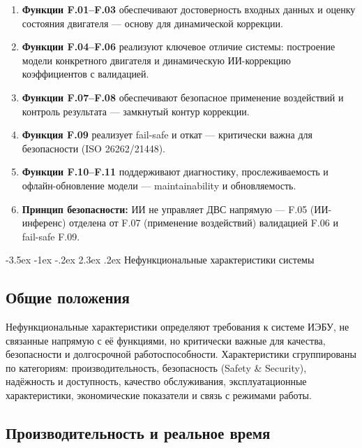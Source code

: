 \documentclass[14pt, a4paper]{extarticle}
\makeatletter
\renewcommand\section{\clearpage\@startsection{section}{1}{1.25cm}%
	{-3.5ex \@plus -1ex \@minus -.2ex}%
	{2.3ex \@plus.2ex}%
	{%
		\bfseries
		\fontsize{16}{1.5}\selectfont
}}
\makeatother
\begin{document}
					\begin{enumerate}
						\item \textbf{Функции F.01–F.03} обеспечивают достоверность входных данных и оценку состояния двигателя — основу для динамической коррекции.
						\item \textbf{Функции F.04–F.06} реализуют ключевое отличие системы: построение модели конкретного двигателя и динамическую ИИ-коррекцию коэффициентов с валидацией.
						\item \textbf{Функции F.07–F.08} обеспечивают безопасное применение воздействий и контроль результата — замкнутый контур коррекции.
						\item \textbf{Функция F.09} реализует fail-safe и откат — критически важна для безопасности (ISO 26262/21448).
						\item \textbf{Функции F.10–F.11} поддерживают диагностику, прослеживаемость и офлайн-обновление модели — maintainability и обновляемость.
						\item \textbf{Принцип безопасности:} ИИ не управляет ДВС напрямую — F.05 (ИИ-инференс) отделена от F.07 (применение воздействий) валидацией F.06 и fail-safe F.09.
					\end{enumerate}
					
				\section{Нефункциональные характеристики системы}
				
				\subsection{Общие положения}
				
				Нефункциональные характеристики определяют требования к системе ИЭБУ, не связанные напрямую с её функциями, но критически важные для качества, безопасности и долгосрочной работоспособности. Характеристики сгруппированы по категориям: производительность, безопасность (Safety \& Security), надёжность и доступность, качество обслуживания, эксплуатационные характеристики, экономические показатели и связь с режимами работы.
				
				\subsection{Производительность и реальное время}
				
\end{document}
